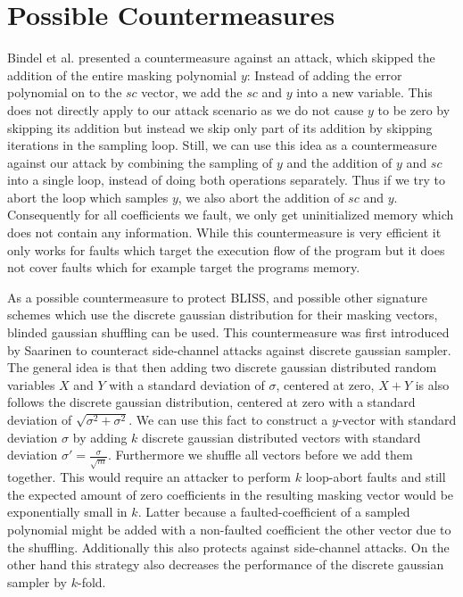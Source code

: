 \section{Possible Countermeasures}
Bindel et al. \cite[p.~74]{sensitivity} presented a countermeasure against an attack, which skipped the addition of the entire masking polynomial $y$: Instead of adding the error polynomial on to the $sc$ vector, we add the $sc$ and $y$ into a new variable. This does not directly apply to our attack scenario as we do not cause $y$ to be zero by skipping its addition but instead we skip only part of its addition by skipping iterations in the sampling loop. Still, we can use this idea as a countermeasure against our attack by combining the sampling of $y$ and the addition of $y$ and $sc$ into a single loop, instead of doing both operations separately. Thus if we try to abort the loop which samples $y$, we also abort the addition of $sc$ and $y$. Consequently for all coefficients we fault, we only get uninitialized memory which does not contain any information. While this countermeasure is very efficient it only works for faults which target the execution flow of the program but it does not cover faults which for example target the programs memory.

As a possible countermeasure to protect BLISS, and possible other signature schemes which use the discrete gaussian distribution for their masking vectors, blinded gaussian shuffling can be used. This countermeasure was first introduced by Saarinen \cite[p.~82]{multishuffle} to counteract side-channel attacks against discrete gaussian sampler. The general idea is that then adding two discrete gaussian distributed random variables $X$ and $Y$ with a standard deviation of $\sigma$, centered at zero, $X + Y$ is also follows the discrete gaussian distribution, centered at zero with a standard deviation of $\sqrt{σ^{2} + σ^{2}}$. We can use this fact to construct a $y$-vector with standard deviation $σ$ by adding $k$ discrete gaussian distributed vectors with standard deviation $σ' = \frac{σ}{\sqrt{m}}$. Furthermore we shuffle all vectors before we add them together. This would require an attacker to perform $k$ loop-abort faults and still the expected amount of zero coefficients in the resulting masking vector would be exponentially small in $k$. Latter because a faulted-coefficient of a sampled polynomial might be added with a non-faulted coefficient the other vector due to the shuffling. Additionally this also protects against side-channel attacks. On the other hand this strategy also decreases the performance of the discrete gaussian sampler by $k$-fold. 


